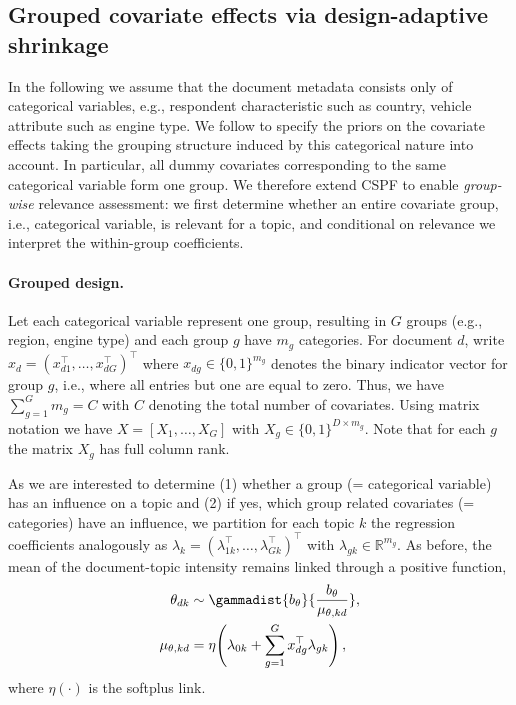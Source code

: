 \clearpage\newpage



\subsection{Grouped covariate effects via design-adaptive shrinkage}
\label{subsec:grouped-covariates}

In the following we assume that the document metadata consists only of  categorical variables, e.g., respondent characteristic such as country, vehicle attribute such as engine type. We follow \cite{paul2025} to specify the priors on the covariate effects taking the grouping structure induced by this categorical nature into account. In particular, all dummy covariates corresponding to the same categorical variable form one group. We therefore extend CSPF to enable \emph{group-wise} relevance assessment: we first determine whether an entire covariate group, i.e., categorical variable, is relevant for a topic, and conditional on relevance we interpret the within-group coefficients.

\paragraph{Grouped design.}
Let each categorical variable represent one group, resulting in $G$ groups (e.g., region, engine type) and each group $g$ have $m_g$ categories. For document $d$, write
$x_d = (x_{d1}^\top,\ldots,x_{dG}^\top)^\top$ where $x_{dg}\in\{0, 1\}^{m_g}$ denotes the
binary indicator vector for group $g$, i.e., where all entries but one are equal to zero. Thus, we have $\sum_{g=1}^G m_g = C$ with $C$ denoting the total number of covariates. Using matrix notation we have $X = [X_1,\ldots,X_G]$ with $X_g\in\{0, 1\}^{D\times m_g}$.  Note that for each $g$ the matrix $X_g$ has full column rank. 

As we are interested to determine (1) whether a group (= categorical variable) has an influence on a topic and (2) if yes, which group related covariates (= categories) have an influence, we partition for each topic $k$ the regression coefficients analogously as
$\lambda_k = (\lambda_{1k}^\top,\ldots,\lambda_{Gk}^\top)^\top$ with $\lambda_{gk}\in\mathbb{R}^{m_g}$.
As before, the mean of the document-topic intensity remains linked through a positive function,
\begin{align}
\theta_{dk} &\sim \gammadist{b_{\theta}}{\frac{b_{\theta}}{\mu_{\theta,kd}}},\\
\mu_{\theta,kd} &= \eta\!\left(\lambda_{0k} + \sum_{g=1}^G x_{dg}^\top \lambda_{gk}\right),
\end{align}
where $\eta(\cdot)$ is the softplus link.

